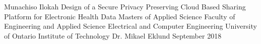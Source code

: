

\graphicspath{{./masc_thesis_system_diagram/}}

\usepackage{hyperref}
\hypersetup{
    colorlinks,
    citecolor=black,
    filecolor=black,
    linkcolor=black,
    urlcolor=black
}



\thesisTitle
  {Munachiso Ilokah}
  {Design of a Secure Privacy Preserving Cloud Based Sharing Platform for Electronic Health Data}
  {Masters of Applied Science}
  {Faculty of Engineering and Applied Science}
  {Electrical and Computer Engineering}
  {University of Ontario Institute of Technology}
  {Dr. Mikael Eklund}
  {September}
  {2018}




\singlespacing
\tableofcontents
\listoffigures
\listoftables
\printglossary[style=list]
\clearpage
\doublespacing
















%


